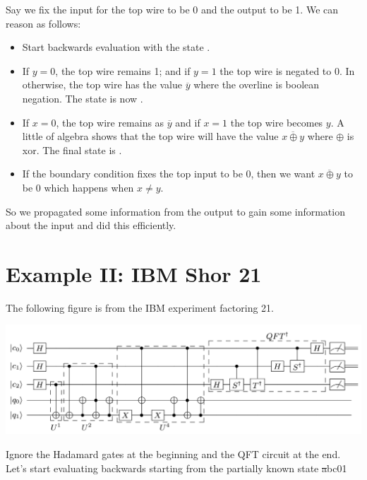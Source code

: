 \documentclass{article}
\begin{document}
Say we fix the input for the top wire to be 0 and the output to be
1. We can reason as follows:

\begin{itemize}
\item Start backwards evaluation with the state .
\item If $y=0$, the top wire remains 1; and if $y=1$ the top wire is
  negated to 0. In otherwise, the top wire has the value
  $\overline{y}$ where the overline is boolean negation. The state is
  now .
\item If $x=0$, the top wire remains as $\overline{y}$ and if $x=1$
  the top wire becomes $y$. A little of algebra shows that the top
  wire will have the value $\overline{x \oplus y}$ where $\oplus$ is
  xor. The final state is .
\item If the boundary condition fixes the top input to be 0, then we
  want $\overline{x \oplus y}$ to be 0 which happens when $x \neq y$.  
\end{itemize}
So we propagated some information from the output to gain some
information about the input and did this efficiently.

\section{Example II: IBM Shor 21}

The following figure is from the IBM experiment factoring 21.

\includegraphics[scale=0.4]{ibmcircuit.png}

Ignore the Hadamard gates at the beginning and the QFT circuit at the
end. Let's start evaluating backwards starting from the partially
known state \st{a}{b}{c}{0}{1}
\end{document}
